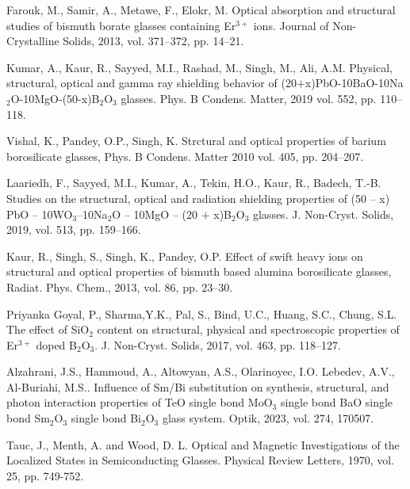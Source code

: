 \documentclass[press]{vestnik}
\begin{document}
\begin{thebibliography}{22}
Farouk, M., Samir, A., Metawe, F., Elokr, M. Optical absorption and 
structural studies of bismuth borate glasses containing Er$^{3+}$ ions. 
Journal of Non-Crystalline Solids, 2013, vol. 371--372, pp. 14--21. 

Kumar, A., Kaur, R., Sayyed, M.I., Rashad, M., Singh, M., Ali, A.M. 
Physical, structural, optical and gamma ray shielding behavior of 
(20$+$x)PbO-10BaO-10Na$_{2}$O-10MgO-(50-x)B$_{2}$O$_{3}$ glasses. Phys. B 
Condens. Matter, 2019 vol. 552, pp. 110--118. 

Vishal, K., Pandey, O.P., Singh, K. Strctural and optical properties of 
barium borosilicate glasses, Phys. B Condens. Matter 2010 vol. 405, pp. 
204--207. 

Laariedh, F., Sayyed, M.I., Kumar, A., Tekin, H.O., Kaur, R., Badech, 
T.-B. Studies on the structural, optical and radiation shielding properties 
of (50 -- x) PbO -- 10WO$_{3}$--10Na$_{2}$O -- 10MgO -- (20 $+$ 
x)B$_{2}$O$_{3}$ glasses. J. Non-Cryst. Solids, 2019, vol. 513, pp. 
159--166. 

Kaur, R., Singh, S., Singh, K., Pandey, O.P. Effect of swift heavy ions 
on structural and optical properties of bismuth based alumina borosilicate 
glasses, Radiat. Phys. Chem., 2013, vol. 86, pp. 23--30. 

Priyanka Goyal, P., Sharma,Y.K., Pal, S., Bind, U.C., Huang, S.C., 
Chung, S.L. The effect of SiO$_{2}$ content on structural, physical and 
spectroscopic properties of Er$^{3+}$ doped B$_{2}$O$_{3}$. J. Non-Cryst. 
Solids, 2017, vol. 463, pp. 118--127. 

Alzahrani, J.S., Hammoud, A., Altowyan, A.S., Olarinoyec, I.O. Lebedev, 
A.V., Al-Buriahi, M.S.. Influence of Sm/Bi substitution on synthesis, 
structural, and photon interaction properties of TeO single bond MoO$_{3}$ 
single bond BaO single bond Sm$_{2}$O$_{3}$ single bond Bi$_{2}$O$_{3}$ 
glass system. Optik, 2023, vol. 274, 170507. 

Tauc, J., Menth, A. and Wood, D. L. Optical and Magnetic Investigations 
of the Localized States in Semiconducting Glasses. Physical Review Letters, 
1970, vol. 25, pp. 749-752. 


\end{thebibliography}
\end{document}
